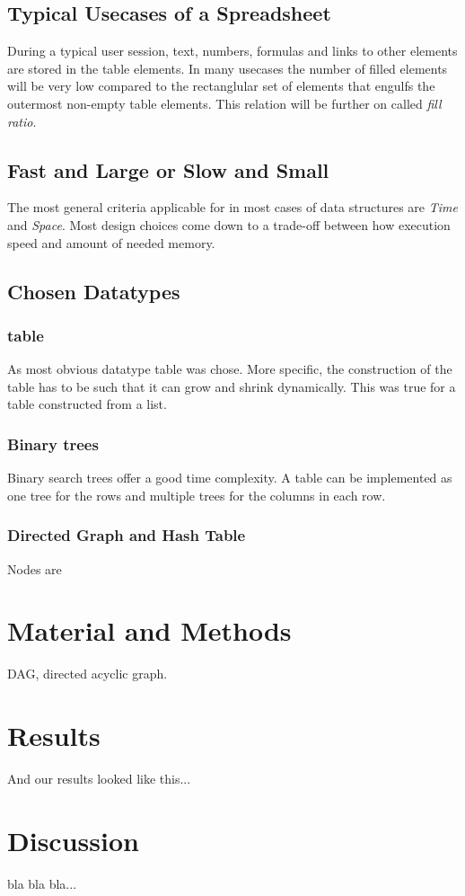 \documentclass[a4paper,11pt,twoside]{article}
\begin{document}
\subsection{Typical Usecases of a Spreadsheet}
During a typical user session, text, numbers, formulas and links to
other elements are stored in the table elements. In many usecases the
number of filled elements will be very low compared to the
rectanglular set of elements that engulfs the outermost non-empty
table elements. This relation will be further on called \emph{fill
  ratio}.



\subsection{Fast and Large or Slow and Small}
The most general criteria applicable for in most cases of data
structures are \emph{Time} and \emph{Space}. Most design choices come
down to a trade-off between how execution speed and amount of needed
memory. 


\subsection{Chosen Datatypes}
\subsubsection{table}
As most obvious datatype table was chose. More specific, the
construction of the table has to be such that it can grow
and shrink dynamically. This was true for a table constructed from a
list. 

\subsubsection{Binary trees}
Binary search trees offer a good time complexity. A table can be
implemented as one tree for the rows and multiple trees for the
columns in each row. 

\subsubsection{Directed Graph and Hash Table}
Nodes are 


\section{Material and Methods}
DAG, directed acyclic graph. 

\section{Results}
And our results looked like this...

\section{Discussion}

bla bla bla... 


\end{document}
